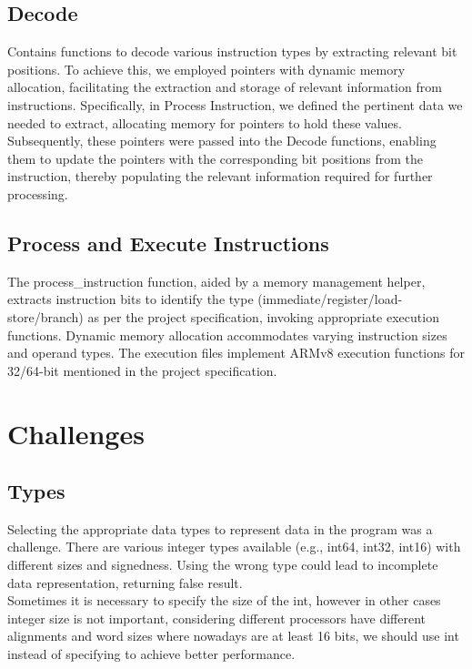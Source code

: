 \documentclass[10pt]{article}
\begin{document}
\subsection{Decode}
Contains functions to decode various instruction types by extracting relevant bit positions. To achieve this, we employed pointers with dynamic memory allocation, facilitating the extraction and storage of relevant information from instructions. Specifically, in Process Instruction, we defined the pertinent data we needed to extract, allocating memory for pointers to hold these values. Subsequently, these pointers were passed into the Decode functions, enabling them to update the pointers with the corresponding bit positions from the instruction, thereby populating the relevant information required for further processing.

\subsection{Process and Execute Instructions}
The process\_instruction function, aided by a memory management helper, extracts instruction bits to identify the type (immediate/register/load-store/branch) as per the project specification, invoking appropriate execution functions. Dynamic memory allocation accommodates varying instruction sizes and operand types. The execution files implement ARMv8 execution functions for 32/64-bit mentioned in the project specification.


\section{Challenges}
\subsection{Types}
Selecting the appropriate data types to represent data in the program was a challenge. There are various integer types available (e.g., int64, int32, int16) with different sizes and signedness. Using the wrong type could lead to incomplete data representation, returning false result. \newline
\\
Sometimes it is necessary to specify the size of the int, however in other cases integer size is not important, considering different processors have different alignments and word sizes where nowadays are at least 16 bits, we should use int instead of specifying to achieve better performance.
\end{document}
